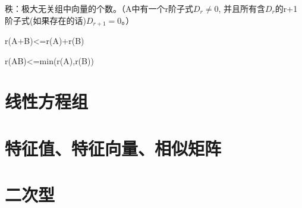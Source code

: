 \documentclass{ctexart}
\begin{document}
秩：极大无关组中向量的个数。（A中有一个r阶子式$D_r\neq 0$, 并且所有含$D_r$的r+1阶子式(如果存在的话)$D_{r+1}=0$。）

r(A+B)<=r(A)+r(B)

r(AB)<=min(r(A),r(B))


\section{线性方程组}



\section{特征值、特征向量、相似矩阵}



\section{二次型}
\end{document}

